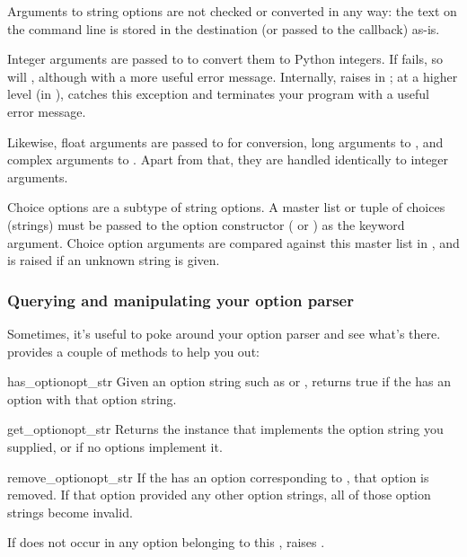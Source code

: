 Arguments to string options are not checked or converted in any way:
the text on the command line is stored in the destination (or passed
to the callback) as-is.

Integer arguments are passed to  to convert them to
Python integers.  If  fails, so will
, although with a more useful error message.
Internally,  raises  in
; at a higher level (in
),  catches this exception and
terminates your program with a useful error message.

Likewise, float arguments are passed to  for
conversion, long arguments to , and complex arguments
to .  Apart from that, they are handled
identically to integer arguments.

Choice options are a subtype of string options. A master list or
tuple of choices (strings) must be passed to the option constructor
( or ) as
the  keyword argument.  Choice option arguments are
compared against this master list in
, and 
is raised if an unknown string is given.

\subsubsection{Querying and manipulating your option parser\label{optparse-querying-and-manipulating}}

Sometimes, it's useful to poke around your option parser and see what's
there.  provides a couple of methods to help you out:

\begin{methoddesc}{has_option}{opt_str}
    Given an option string such as  or
    , returns true if the 
    has an option with that option string.
\end{methoddesc}

\begin{methoddesc}{get_option}{opt_str}
    Returns the  instance that implements the option
    string you supplied, or  if no options implement it.
\end{methoddesc}

\begin{methoddesc}{remove_option}{opt_str}
    If the  has an option corresponding to
    , that option is removed.  If that option provided
    any other option strings, all of those option strings become
    invalid.

    If  does not occur in any option belonging to this
    , raises .
\end{methoddesc}

